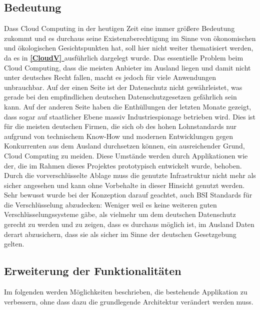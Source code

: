\documentclass[13pt,a4paper,bibliography=totocnumbered,listof=totocnumbered]{scrartcl}
\newcommand*{\fullref}[1]{\textbf{\hyperref[{#1}]{\ref*{#1} \nameref*{#1}}}}
\begin{document}
\subsection{Bedeutung}
Dass Cloud Computing in der heutigen Zeit eine immer größere Bedeutung zukommt und es durchaus seine Existenzberechtigung im Sinne von ökonomischen und ökologischen Gesichtspunkten hat, soll hier nicht weiter thematisiert werden, da es in \fullref{CloudV} ausführlich dargelegt wurde. Das essentielle Problem beim Cloud Computing, dass die meisten Anbieter im Ausland liegen und damit nicht unter deutsches Recht fallen, macht es jedoch für viele Anwendungen unbrauchbar. Auf der einen Seite ist der Datenschutz nicht gewährleistet, was gerade bei den empfindlichen deutschen Datenschutzgesetzen gefährlich sein kann. Auf der anderen Seite haben die Enthüllungen der letzten Monate gezeigt, dass sogar auf staatlicher Ebene massiv Industriespionage betrieben wird. Dies ist für die meisten deutschen Firmen, die sich ob des hohen Lohnstandards nur aufgrund von technischem Know-How und modernen Entwicklungen gegen Konkurrenten aus dem Ausland durchsetzen können, ein ausreichender Grund, Cloud Computing zu meiden. Diese Umstände werden durch Applikationen wie der, die im Rahmen dieses Projektes prototypisch entwickelt wurde, behoben. Durch die vorverschlüsselte Ablage muss die genutzte Infrastruktur nicht mehr als sicher angesehen und kann ohne Vorbehalte in dieser Hinsicht genutzt werden. Sehr bewusst wurde bei der Konzeption darauf geachtet, auch BSI Standards für die Verschlüsselung abzudecken: Weniger weil es keine weiteren guten Verschlüsselungssysteme gäbe, als vielmehr um dem deutschen Datenschutz gerecht zu werden und zu zeigen, dass es durchaus möglich ist, im Ausland Daten derart abzusichern, dass sie als sicher im Sinne der deutschen Gesetzgebung gelten.

\subsection{Erweiterung der Funktionalitäten}
Im folgenden werden Möglichkeiten beschrieben, die bestehende Applikation zu verbessern, ohne dass dazu die grundlegende Architektur verändert werden muss.
\end{document}
